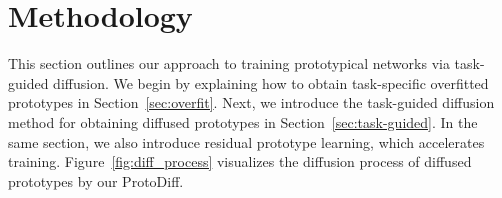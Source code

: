 


\section{Methodology}
This section outlines our approach to training prototypical networks via task-guided diffusion. We begin by explaining how to obtain task-specific overfitted prototypes in Section~\ref{sec:overfit}. Next, we introduce the task-guided diffusion method for obtaining diffused prototypes in Section~\ref{sec:task-guided}. In the same section, we also introduce residual prototype learning, which accelerates training. Figure~\ref{fig:diff_process} visualizes the diffusion process of diffused prototypes by our ProtoDiff.







